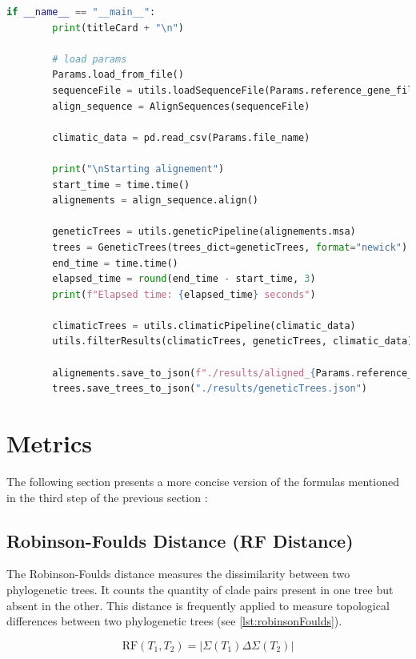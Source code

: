 \begin{lstlisting}[label=lst:main,language=Python,caption=aPhyloGeo’s main function]
    if __name__ == "__main__":
        print(titleCard + "\n")

        # load params 
        Params.load_from_file()
        sequenceFile = utils.loadSequenceFile(Params.reference_gene_filepath)
        align_sequence = AlignSequences(sequenceFile)

        climatic_data = pd.read_csv(Params.file_name)

        print("\nStarting alignement")
        start_time = time.time()
        alignements = align_sequence.align()

        geneticTrees = utils.geneticPipeline(alignements.msa)
        trees = GeneticTrees(trees_dict=geneticTrees, format="newick")
        end_time = time.time()
        elapsed_time = round(end_time - start_time, 3)
        print(f"Elapsed time: {elapsed_time} seconds")

        climaticTrees = utils.climaticPipeline(climatic_data)
        utils.filterResults(climaticTrees, geneticTrees, climatic_data)

        alignements.save_to_json(f"./results/aligned_{Params.reference_gene_file}.json")
        trees.save_trees_to_json("./results/geneticTrees.json")
\end{lstlisting}

\section{Metrics}\label{metrics}
The following section presents a more concise version of the formulas mentioned in the third step of the previous section :

\subsection{Robinson-Foulds Distance (RF Distance)}\label{RF}
The Robinson-Foulds distance measures the dissimilarity between two phylogenetic trees. It counts the quantity of clade pairs present in one tree but absent in the other. This distance is frequently applied to measure topological differences between two phylogenetic trees (see \autoref{lst:robinsonFoulds}).

\begin{equation}
    \text{RF}(T_1, T_2) = | \Sigma(T_1) \Delta \Sigma(T_2) |
\end{equation}

